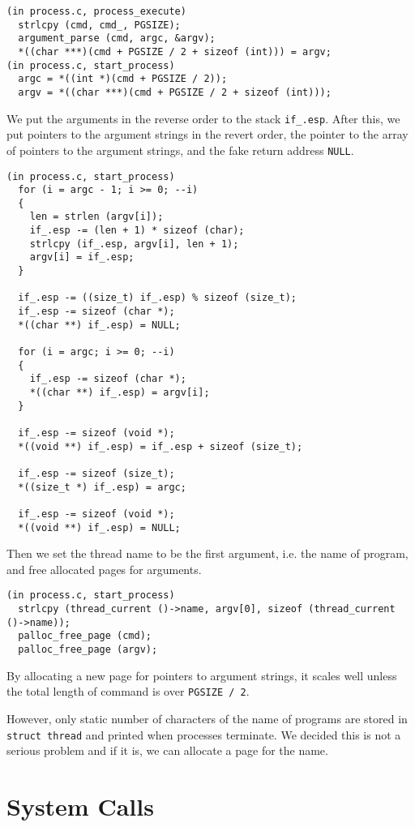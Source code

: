 \documentclass[a4paper,article,11pt,oneside]{article}
\begin{document}
\begin{verbatim}
(in process.c, process_execute)
  strlcpy (cmd, cmd_, PGSIZE);
  argument_parse (cmd, argc, &argv);
  *((char ***)(cmd + PGSIZE / 2 + sizeof (int))) = argv;
(in process.c, start_process)
  argc = *((int *)(cmd + PGSIZE / 2));
  argv = *((char ***)(cmd + PGSIZE / 2 + sizeof (int)));
\end{verbatim}

We put the arguments in the reverse order to the stack
\texttt{if\_.esp}. After this, we put pointers to the argument strings
in the revert order, the pointer to the array of pointers to the
argument strings, and the fake return address \texttt{NULL}.
\begin{verbatim}
(in process.c, start_process)
  for (i = argc - 1; i >= 0; --i)
  {
    len = strlen (argv[i]);
    if_.esp -= (len + 1) * sizeof (char);
    strlcpy (if_.esp, argv[i], len + 1);
    argv[i] = if_.esp;
  }

  if_.esp -= ((size_t) if_.esp) % sizeof (size_t);
  if_.esp -= sizeof (char *);
  *((char **) if_.esp) = NULL;

  for (i = argc; i >= 0; --i)
  {
    if_.esp -= sizeof (char *);
    *((char **) if_.esp) = argv[i];
  }

  if_.esp -= sizeof (void *);
  *((void **) if_.esp) = if_.esp + sizeof (size_t);

  if_.esp -= sizeof (size_t);
  *((size_t *) if_.esp) = argc;

  if_.esp -= sizeof (void *);
  *((void **) if_.esp) = NULL;
\end{verbatim}

Then we set the thread name to be the first argument, i.e. the name of
program, and free allocated pages for arguments.
\begin{verbatim}
(in process.c, start_process)
  strlcpy (thread_current ()->name, argv[0], sizeof (thread_current ()->name));
  palloc_free_page (cmd);
  palloc_free_page (argv);
\end{verbatim}

By allocating a new page for pointers to argument strings, it scales
well unless the total length of command is over \texttt{PGSIZE / 2}.

However, only static number of characters of the name of programs
are stored in \texttt{struct thread} and printed when processes
terminate. We decided this is not a serious problem and if it is, we
can allocate a page for the name.

\section{System Calls}\label{secsys}
\end{document}
